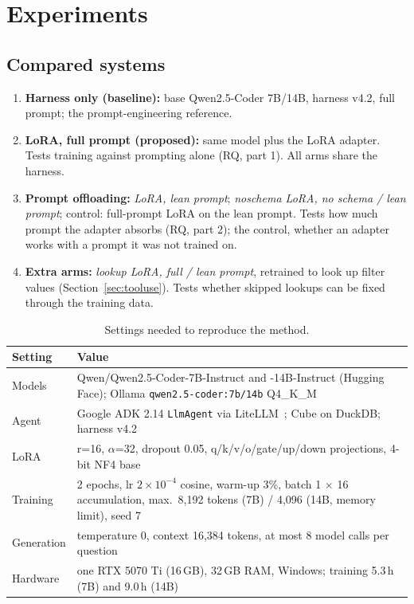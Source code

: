 \section{Experiments}

\subsection{Compared systems}
\begin{enumerate}[nosep,leftmargin=1.5em]
  \item \textbf{Harness only (baseline):} base Qwen2.5-Coder 7B/14B, harness v4.2, full prompt; the prompt-engineering reference.
  \item \textbf{LoRA, full prompt (proposed):} same model plus the LoRA adapter. Tests training against prompting alone (RQ, part 1). All arms share the harness.
  \item \textbf{Prompt offloading:} \emph{LoRA, lean prompt}; \emph{noschema LoRA, no schema / lean prompt}; control: full-prompt LoRA on the lean prompt. Tests how much prompt the adapter absorbs (RQ, part 2); the control, whether an adapter works with a prompt it was not trained on.
  \item \textbf{Extra arms:} \emph{lookup LoRA, full / lean prompt}, retrained to look up filter values (Section~\ref{sec:tooluse}). Tests whether skipped lookups can be fixed through the training data.
\end{enumerate}


\begin{table}[H]
\centering
\small
\caption{Settings needed to reproduce the method.}\label{tab:settings}
\begin{tabularx}{0.95\linewidth}{@{}lX@{}}
\toprule
\textbf{Setting} & \textbf{Value}\\
\midrule
Models & Qwen/Qwen2.5-Coder-7B-Instruct and -14B-Instruct (Hugging Face); Ollama \texttt{qwen2.5-coder:7b/14b} Q4\_K\_M\\
Agent & Google ADK 2.14 \texttt{LlmAgent} via LiteLLM~\cite{adk}; Cube on DuckDB; harness v4.2\\
LoRA & r=16, $\alpha$=32, dropout 0.05, q/k/v/o/gate/up/down projections, 4-bit NF4 base\\
Training & 2 epochs, lr $2\times10^{-4}$ cosine, warm-up 3\%, batch 1 $\times$ 16 accumulation, max.\ 8,192 tokens (7B) / 4,096 (14B, memory limit), seed 7\\
Generation & temperature 0, context 16,384 tokens, at most 8 model calls per question\\
Hardware & one RTX 5070 Ti (16\,GB), 32\,GB RAM, Windows; training 5.3\,h (7B) and 9.0\,h (14B)\\
\bottomrule
\end{tabularx}
\end{table}

